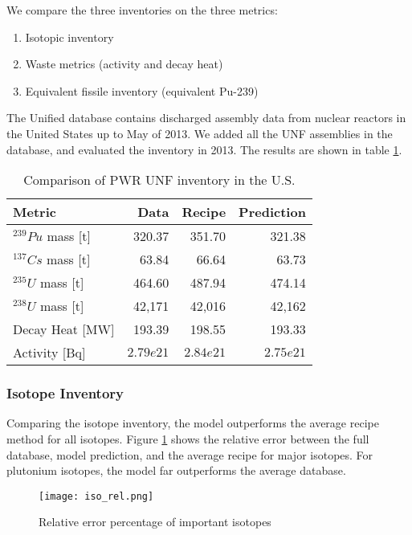 We compare the three inventories on the three
metrics:
\begin{enumerate}
    \item Isotopic inventory
    \item Waste metrics (activity and decay heat)
    \item Equivalent fissile inventory (equivalent Pu-239)
\end{enumerate}

The Unified database contains discharged assembly data
from nuclear reactors in the United States up to May of
2013. We added all the \gls{UNF} assemblies in the database,
and evaluated the inventory in 2013. The results are shown
in table \ref{tab:met}.

\begin{table}[h]
    \centering
    \begin{tabular}{l|r|rr}
        \hline
        Metric & Data & Recipe & Prediction \\
        \hline
        $^{239}Pu$ mass [t] & 320.37 & 351.70 & 321.38\\
        $^{137}Cs$ mass [t] & 63.84 & 66.64 & 63.73 \\
        $^{235}U$ mass [t] & 464.60 & 487.94 & 474.14\\
        $^{238}U$ mass [t] & 42,171 & 42,016 & 42,162\\
        \hline
        Decay Heat [MW] & 193.39 & 198.55 & 193.33 \\
        Activity [Bq] & $2.79e21$ & $2.84e21$ & $2.75e21$ \\
        \hline
    \end{tabular}
    \caption{Comparison of \gls{PWR} \gls{UNF} inventory in the U.S. 
    \label{tab:met}}
\end{table}

\FloatBarrier

\subsubsection{Isotope Inventory}

Comparing the isotope inventory, the model outperforms the
average recipe method for all isotopes.
Figure \ref{fig:iso_rel} shows the relative
error between the full database, model prediction, and
the average recipe for
major isotopes. For plutonium isotopes, the model far
outperforms the average database.

\begin{figure}
    \centering
    \texttt{[image: iso\_rel.png]}
    \caption{Relative error percentage of important isotopes}
    \label{fig:iso_rel}
\end{figure}



